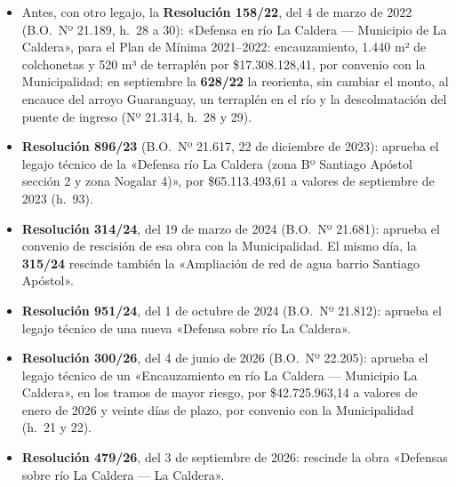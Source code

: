 \begin{itemize}[leftmargin=*,itemsep=1pt]
\item Antes, con otro legajo, la \textbf{Resolución 158/22}, del 4 de marzo de 2022 (B.O.\ Nº 21.189, h.\ 28 a 30): «Defensa en río La Caldera --- Municipio de La Caldera», para el Plan de Mínima 2021--2022: encauzamiento, 1.440 m² de colchonetas y 520 m³ de terraplén por \$17.308.128,41, por convenio con la Municipalidad; en septiembre la \textbf{628/22} la reorienta, sin cambiar el monto, al encauce del arroyo Guaranguay, un terraplén en el río y la descolmatación del puente de ingreso (Nº 21.314, h.\ 28 y 29).
\item \textbf{Resolución 896/23} (B.O.\ Nº 21.617, 22 de diciembre de 2023): aprueba el legajo técnico de la «Defensa río La Caldera (zona Bº Santiago Apóstol sección 2 y zona Nogalar 4)», por \$65.113.493,61 a valores de septiembre de 2023 (h.\ 93).
\item \textbf{Resolución 314/24}, del 19 de marzo de 2024 (B.O.\ Nº 21.681): aprueba el convenio de rescisión de esa obra con la Municipalidad. El mismo día, la \textbf{315/24} rescinde también la «Ampliación de red de agua barrio Santiago Apóstol».
\item \textbf{Resolución 951/24}, del 1 de octubre de 2024 (B.O.\ Nº 21.812): aprueba el legajo técnico de una nueva «Defensa sobre río La Caldera».
\item \textbf{Resolución 300/26}, del 4 de junio de 2026 (B.O.\ Nº 22.205): aprueba el legajo técnico de un «Encauzamiento en río La Caldera --- Municipio La Caldera», en los tramos de mayor riesgo, por \$42.725.963,14 a valores de enero de 2026 y veinte días de plazo, por convenio con la Municipalidad (h.\ 21 y 22).
\item \textbf{Resolución 479/26}, del 3 de septiembre de 2026: rescinde la obra «Defensas sobre río La Caldera --- La Caldera».
\end{itemize}

